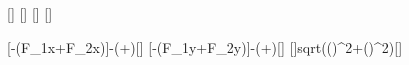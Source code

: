 [\N]
[\N]
[\N]
[\N]

[-\left(F_{1x}+F_{2x}\right)]{-(\FaxX+\FbxX)}[\N]
[-\left(F_{1y}+F_{2y}\right)]{-(\FayX+\FbyX)}[\N]
[]{sqrt((\FcxX)^2+(\FcyX)^2)}[\N]
